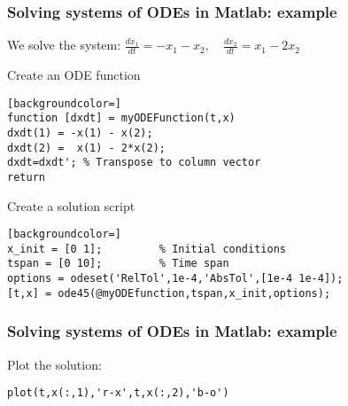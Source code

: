 \documentclass[11pt,table,final,fleqn,xcolor={usenames,dvipsnames,table}]{beamer}
\begin{document}
\begin{frame}[fragile]
  \frametitle{Solving systems of ODEs in Matlab: example}
  We solve the system: $\displaystyle \frac{dx_1}{dt} = -x_1 - x_2, \quad  \frac{dx_2}{dt} = x_1 - 2x_2 $
  \begin{block}{Create an ODE function}
    \begin{lstlisting}[backgroundcolor=]
function [dxdt] = myODEFunction(t,x)
dxdt(1) = -x(1) - x(2);
dxdt(2) =  x(1) - 2*x(2);
dxdt=dxdt'; % Transpose to column vector
return
    \end{lstlisting}
  \end{block}
  \pause
  \begin{block}{Create a solution script}
    \begin{lstlisting}[backgroundcolor=]
x_init = [0 1];         % Initial conditions
tspan = [0 10];         % Time span
options = odeset('RelTol',1e-4,'AbsTol',[1e-4 1e-4]);
[t,x] = ode45(@myODEfunction,tspan,x_init,options);
    \end{lstlisting}
  \end{block}
\vfill
\end{frame}

\begin{frame}[fragile]
  \frametitle{Solving systems of ODEs in Matlab: example}
  Plot the solution:
  \begin{lstlisting}
plot(t,x(:,1),'r-x',t,x(:,2),'b-o')
  \end{lstlisting}
  \pause
  \begin{center}
  \end{center}
\end{frame}
\end{document}
